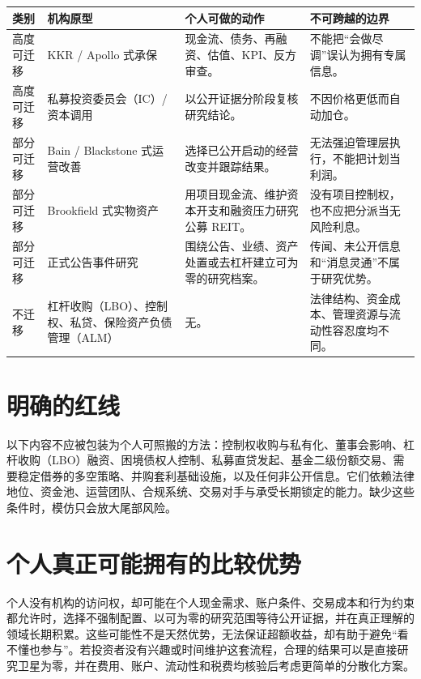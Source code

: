 \begin{exhibitbox}
\small
\begin{tabularx}{\exhibitboxwidth}{L{2.7cm} L{3.0cm} X L{3.1cm}}
\toprule
\textbf{类别} & \textbf{机构原型} & \textbf{个人可做的动作} & \textbf{不可跨越的边界} \\
\midrule
高度可迁移 & KKR / Apollo 式承保 & 现金流、债务、再融资、估值、KPI、反方审查。 & 不能把“会做尽调”误认为拥有专属信息。 \\
高度可迁移 & 私募投资委员会（IC）/ 资本调用 & 以公开证据分阶段复核研究结论。 & 不因价格更低而自动加仓。 \\
部分可迁移 & Bain / Blackstone 式运营改善 & 选择已公开启动的经营改变并跟踪结果。 & 无法强迫管理层执行，不能把计划当利润。 \\
部分可迁移 & Brookfield 式实物资产 & 用项目现金流、维护资本开支和融资压力研究公募 REIT。 & 没有项目控制权，也不应把分派当无风险利息。 \\
部分可迁移 & 正式公告事件研究 & 围绕公告、业绩、资产处置或去杠杆建立可为零的研究档案。 & 传闻、未公开信息和“消息灵通”不属于研究优势。 \\
不迁移 & 杠杆收购（LBO）、控制权、私贷、保险资产负债管理（ALM） & 无。 & 法律结构、资金成本、管理资源与流动性容忍度均不同。 \\
\bottomrule
\end{tabularx}
\end{exhibitbox}

\section{明确的红线}

\begin{riskbox}
以下内容不应被包装为个人可照搬的方法：控制权收购与私有化、董事会影响、杠杆收购（LBO）融资、困境债权人控制、私募直贷发起、基金二级份额交易、需要稳定借券的多空策略、并购套利基础设施，以及任何非公开信息。它们依赖法律地位、资金池、运营团队、合规系统、交易对手与承受长期锁定的能力。缺少这些条件时，模仿只会放大尾部风险。
\end{riskbox}

\section{个人真正可能拥有的比较优势}

个人没有机构的访问权，却可能在个人现金需求、账户条件、交易成本和行为约束都允许时，选择不强制配置、以可为零的研究范围等待公开证据，并在真正理解的领域长期积累。这些可能性不是天然优势，无法保证超额收益，却有助于避免“看不懂也参与”。若投资者没有兴趣或时间维护这套流程，合理的结果可以是直接研究卫星为零，并在费用、账户、流动性和税费均核验后考虑更简单的分散化方案。

